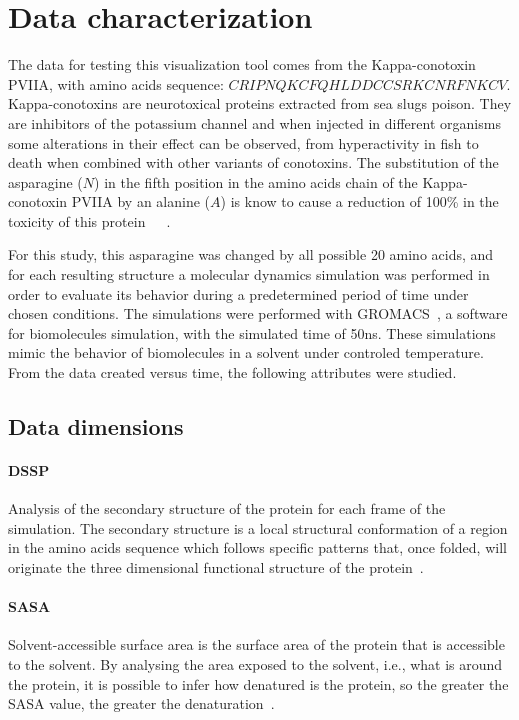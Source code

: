 \documentclass[10pt, conference]{IEEEtran}
\begin{document}
\section{Data characterization}

The data for testing this visualization tool comes from the Kappa-conotoxin PVIIA, with amino acids sequence: $CRIPNQKCFQHLDDCCSRKCNRFNKCV$. Kappa-conotoxins are neurotoxical proteins extracted from sea slugs poison. They are inhibitors of the potassium channel and when injected in different organisms some alterations in their effect can be observed, from hyperactivity in fish to death when combined with other variants of conotoxins. The substitution of the asparagine ($N$) in the fifth position in the amino acids chain of the Kappa-conotoxin PVIIA by an alanine ($A$) is know to cause a reduction of 100\% in the toxicity of this protein~\cite{jacobsen2000single}~\cite{mir2016conotoxins}~\cite{akey2002inherited}.

For this study, this asparagine was changed by all possible 20 amino acids, and for each resulting structure a molecular dynamics simulation was performed in order to evaluate its behavior during a predetermined period of time under chosen conditions. The simulations were performed with GROMACS~\cite{hess2008gromacs}, a software for biomolecules simulation, with the simulated time of 50ns. These simulations mimic the behavior of biomolecules in a solvent under controled temperature. From the data created versus time, the following attributes were studied.

\subsection{Data dimensions}

\paragraph*{DSSP} Analysis of the secondary structure of the protein for each frame of the simulation. The secondary structure is a local structural conformation of a region in the amino acids sequence which follows specific patterns that, once folded, will originate the three dimensional functional structure of the protein~\cite{kabsch1983dictionary}. 
%

\paragraph*{SASA} Solvent-accessible surface area is the surface area of the protein that is accessible to the solvent. By analysing the area exposed to the solvent, i.e., what is around the protein, it is possible to infer how denatured is the protein, so the greater the SASA value, the greater the denaturation~\cite{richmond1984solvent}.
%
\end{document}
